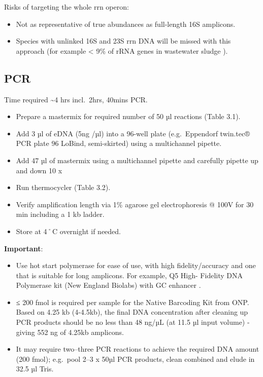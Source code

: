 \documentclass[
]{book}
\providecommand{\tightlist}{%
  \setlength{\itemsep}{0pt}\setlength{\parskip}{0pt}}
\begin{document}
Risks of targeting the whole rrn operon:

\begin{itemize}
\tightlist
\item
  Not as representative of true abundances as full-length 16S amplicons.\\
\item
  Species with unlinked 16S and 23S rrn DNA will be missed with this approach (for example \textless{} 9\% of rRNA genes in wastewater sludge \citep{Brewer2020}).
\end{itemize}

\subsection{PCR}\label{pcr}

Time required \textasciitilde4 hrs incl.~2hrs, 40mins PCR.

\begin{itemize}
\tightlist
\item
  Prepare a mastermix for required number of 50 µl reactions (Table 3.1).
\item
  Add 3 µl of eDNA (5ng /µl) into a 96-well plate (e.g.~Eppendorf twin.tec® PCR plate 96 LoBind, semi-skirted) using a multichannel pipette.\\
\item
  Add 47 µl of mastermix using a multichannel pipette and carefully pipette up and down 10 x
\item
  Run thermocycler (Table 3.2).
\item
  Verify amplification length via 1\% agarose gel electrophoresis @ 100V for 30 min including a 1 kb ladder.
\item
  Store at 4˚C overnight if needed.
\end{itemize}

\textbf{Important}:

\begin{itemize}
\tightlist
\item
  Use hot start polymerase for ease of use, with high fidelity/accuracy and one that is suitable for long amplicons. For example, Q5 High- Fidelity DNA Polymerase kit (New England Biolabs) with GC enhancer \citep{Martijn2019}.\\
\item
  ≤ 200 fmol is required per sample for the Native Barcoding Kit from ONP. Based on 4.25 kb (4-4.5kb), the final DNA concentration after cleaning up PCR products should be no less than 48 ng/µL (at 11.5 µl input volume) - giving 552 ng of 4.25kb amplicons.\\
\item
  It may require two--three PCR reactions to achieve the required DNA amount (200 fmol); e.g.~pool 2--3 x 50µl PCR products, clean combined and elude in 32.5 µl Tris.
\end{itemize}
\end{document}

